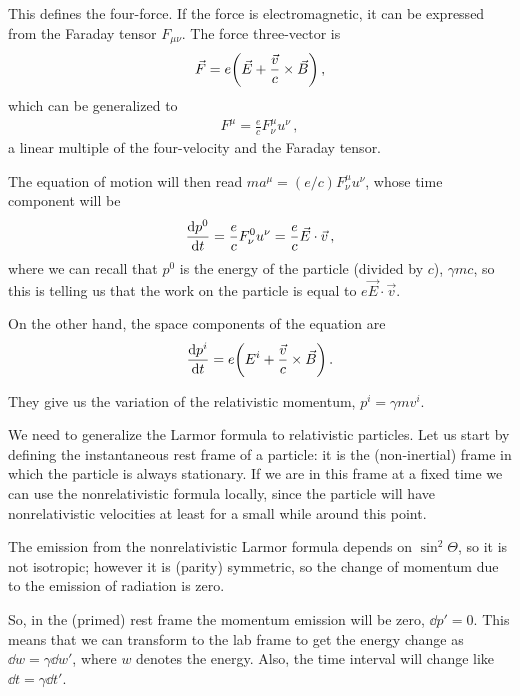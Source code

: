 \documentclass[main.tex]{subfiles}
\begin{document}
This defines the four-force. If the force is electromagnetic, it can be expressed from the Faraday tensor \(F_{\mu \nu }\). 
The force three-vector is 
%
\begin{align}
\vec{F} = e \qty(\vec{E} + \frac{\vec{v}}{c} \times \vec{B})
\,,
\end{align}
%
which can be generalized to 
%
\begin{align}
F^{\mu } = \frac{e}{c} F^{\mu }_{\nu } u^{\nu }
\,,
\end{align}
%
a linear multiple of the four-velocity and the Faraday tensor. 

The equation of motion will then read \(m a^{\mu } = (e/c) F^{\mu }_{\nu } u^{\nu } \), whose time component will be 
%
\begin{align}
\dv{p^{0}}{t} = \frac{e}{c} F^{0}_{\nu } u^{\nu } = \frac{e}{c} \vec{E} \cdot \vec{v}
\,,
\end{align}
%
where we can recall that \(p^{0}\) is the energy of the particle (divided by \(c\)), \(\gamma mc\), so this is telling us that the work on the particle is equal to \(e \vec{E} \cdot \vec{v}\).    

On the other hand, the space components of the equation are 
%
\begin{align}
\dv{p^{i}}{t} = e \qty(E^{i} + \frac{\vec{v}}{c} \times \vec{B})
\,.
\end{align}

They give us the variation of the relativistic momentum, \(p^{i} = \gamma m v^{i}\).

We need to generalize the Larmor formula to relativistic particles. 
Let us start by defining the instantaneous rest frame of a particle: it is the (non-inertial) frame in which the particle is always stationary. 
If we are in this frame at a fixed time we can use the nonrelativistic formula locally, since the particle will have nonrelativistic velocities at least for a small while around this point. 

The emission from the nonrelativistic Larmor formula depends on \(\sin^2 \Theta \), so it is not isotropic; however it is (parity) symmetric, so the change of momentum due to the emission of radiation is zero. 


So, in the (primed) rest frame the momentum emission will be zero, \(\dd{p}' = 0\).
This means that we can transform to the lab frame to get the energy change as \(\dd{w} = \gamma \dd{w}'\), where \(w\) denotes the energy. 
Also, the time interval will change like \(\dd{t} = \gamma \dd{t'}\). 
\end{document}
